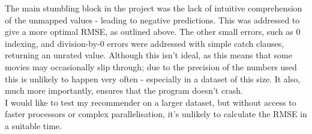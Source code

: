 \documentclass{scrartcl}
\begin{document}
The main stumbling block in the project was the lack of intuitive comprehension of the unmapped values - leading to negative predictions. This was addressed to give a more optimal RMSE, as outlined above. The other small errors, such as 0 indexing, and division-by-0 errors were addressed with simple catch clauses, returning an unrated value. Although this isn't ideal, as this means that some movies may occasionally slip through; due to the precision of the numbers used this is unlikely to happen very often - especially in a dataset of this size. It also, much more importantly, ensures that the program doesn't crash. \\

I would like to test my recommender on a larger dataset, but without access to faster processors or complex parallelisation, it's unlikely to calculate the RMSE in a suitable time.

\end{document}
